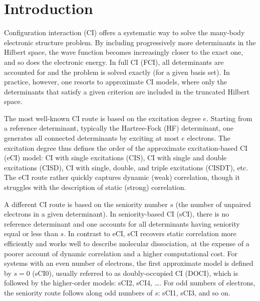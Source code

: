 \documentclass[aip,jcp,reprint,noshowkeys,superscriptaddress]{revtex4-1}
\begin{document}

\section{Introduction}
\label{sec:intro}

Configuration interaction (CI) offers a systematic way to solve the many-body electronic structure problem. \cite{SzaboBook,Helgakerbook}
By including progressively more determinants in the Hilbert space, the wave function becomes increasingly closer to the exact one, and so does the electronic energy.
In full CI (FCI), all determinants are accounted for and the problem is solved exactly (for a given basis set).
In practice, however, one resorts to approximate CI models, where only the determinants that satisfy a given criterion are included in the truncated Hilbert space.

The most well-known CI route is based on the excitation degree $e$.
Starting from a reference determinant, typically the Hartree-Fock (HF) determinant, one generates all connected determinants by exciting at most $e$ electrons.
The excitation degree thus defines the order of the approximate excitation-based CI (eCI) model:
CI with single excitations (CIS), CI with single and double excitations (CISD), CI with single, double, and triple excitations (CISDT), etc.
The eCI route rather quickly captures dynamic (weak) correlation, though it struggles with the description of static (strong) correlation.

A different CI route is based on the seniority number $s$ (the number of unpaired electrons in a given determinant).
In seniority-based CI (sCI), \cite{Bytautas_2011,Allen_1962,Smith_1965,Veillard_1967} there is no reference determinant and one accounts for all determinants having seniority equal or less than $s$.
In contrast to eCI, sCI recovers static correlation more efficiently and works well to describe molecular dissociation, \cite{Bytautas_2015,Alcoba_2014,Alcoba_2014b}
at the expense of a poorer account of dynamic correlation and a higher computational cost.
For systems with an even number of electrons, the first approximate model is defined by $s=0$ (sCI0), usually referred to as doubly-occupied CI (DOCI),
which is followed by the higher-order models: sCI2, sCI4, \ldots.
For odd numbers of electrons, the seniority route follows along odd numbers of $s$: sCI1, sCI3, and so on.
\end{document}
